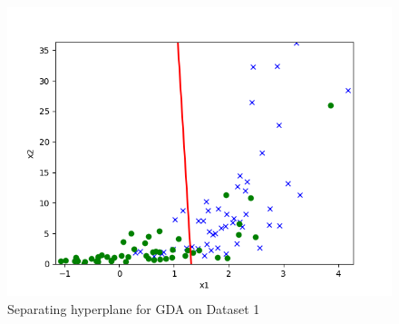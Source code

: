 \begin{answer}
	\begin{figure}[H]
		\centering
		\vspace{2mm}
		\includegraphics[width=0.65\linewidth]{../src/linearclass/gda_pred_1.png}
        \caption{Separating hyperplane for GDA on Dataset 1}
	\end{figure}
\end{answer}
